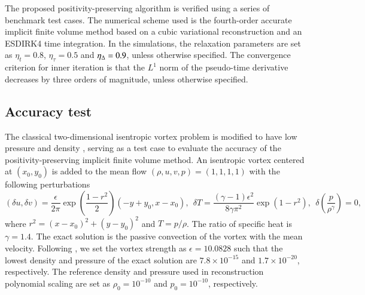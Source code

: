 The proposed positivity-preserving algorithm is verified using a series of benchmark test cases.
The numerical scheme used is the fourth-order accurate implicit finite volume method based on a
cubic variational reconstruction and an ESDIRK4 time integration.
In the simulations, the relaxation parameters are set as $\eta_t= 0.8$, $\eta_\tau=0.5$ and $\eta_\mathrm\Delta=0.9$,
unless otherwise specified.
The convergence criterion for inner iteration is that
the $L^1$ norm of the pseudo-time derivative decreases by three orders of magnitude, unless otherwise specified.

\subsection{Accuracy test}
\label{ssec:accuracy-test}

The classical two-dimensional isentropic vortex problem \cite{hu1999weighted_WENO}
is modified to have low pressure and density \cite{zhang2012positivity}, serving as a test case to evaluate the accuracy of the positivity-preserving implicit finite volume method.
An isentropic vortex centered at $(x_0,y_0)$ is added to the mean flow $(\rho, u, v, p)=(1,1,1,1)$ with the following perturbations
\begin{equation}
    (\delta u, \delta v) = \frac{\epsilon}{2\pi} \exp(\frac{1-r^2}{2}) (-y+y_0, x-x_0),\ \
    \delta T = \frac{(\gamma-1)\epsilon^2}{8\gamma \pi^2}\exp(1-r^2), \ \ \delta\left(\frac{p}{\rho^\gamma}\right)=0, 
\end{equation}
where $r^2=(x-x_0)^2+(y-y_0)^2$ and $T= p/\rho$. The ratio of specific heat is $\gamma=1.4$. The exact solution is the passive convection of the vortex with the mean velocity. Following \cite{zhang2012positivity}, we set the vortex strength as $\epsilon = 10.0828$ such that the lowest density and pressure of the exact solution are $7.8 \times 10^{-15}$ and $1.7 \times 10^{-20}$, respectively.
The reference density and pressure used in reconstruction polynomial scaling are set as $\rho_0 = 10^{-10}$ and $p_0=10^{-10}$, respectively. %

